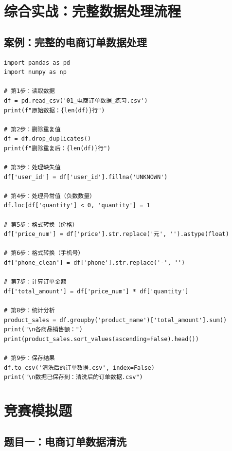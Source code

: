 \documentclass[12pt,a4paper]{article}
\begin{document}
\section{综合实战：完整数据处理流程}

\subsection{案例：完整的电商订单数据处理}

\begin{lstlisting}[caption={完整的数据处理流程}]
import pandas as pd
import numpy as np

# 第1步：读取数据
df = pd.read_csv('01_电商订单数据_练习.csv')
print(f"原始数据：{len(df)}行")

# 第2步：删除重复值
df = df.drop_duplicates()
print(f"删除重复后：{len(df)}行")

# 第3步：处理缺失值
df['user_id'] = df['user_id'].fillna('UNKNOWN')

# 第4步：处理异常值（负数数量）
df.loc[df['quantity'] < 0, 'quantity'] = 1

# 第5步：格式转换（价格）
df['price_num'] = df['price'].str.replace('元', '').astype(float)

# 第6步：格式转换（手机号）
df['phone_clean'] = df['phone'].str.replace('-', '')

# 第7步：计算订单金额
df['total_amount'] = df['price_num'] * df['quantity']

# 第8步：统计分析
product_sales = df.groupby('product_name')['total_amount'].sum()
print("\n各商品销售额：")
print(product_sales.sort_values(ascending=False).head())

# 第9步：保存结果
df.to_csv('清洗后的订单数据.csv', index=False)
print("\n数据已保存到：清洗后的订单数据.csv")
\end{lstlisting}

\section{竞赛模拟题}

\subsection{题目一：电商订单数据清洗}
\end{document}
